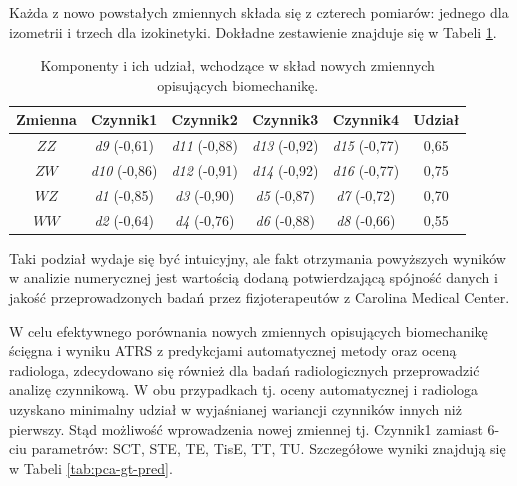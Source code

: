 Każda z nowo powstałych zmiennych składa się z czterech pomiarów: jednego dla izometrii i trzech dla izokinetyki. Dokładne zestawienie znajduje się w Tabeli \ref{tab:bio-new-factors}.
\vspace{20px}
\begin{table}[h!]
	\centering
	\setlength{\tabcolsep}{3pt}
	\setlength\extrarowheight{2pt}
	\caption{Komponenty i ich udział, wchodzące w skład nowych zmiennych opisujących biomechanikę.}
	\label{tab:bio-new-factors}
	\begin{tabular}{c|c|c|c|c||c}
		Zmienna&Czynnik1&Czynnik2&Czynnik3&Czynnik4&Udział \\
		\hline \hline
		$ZZ$&\textit{d9} (-0,61)&\textit{d11} (-0,88)&\textit{d13} (-0,92)&\textit{d15} (-0,77)&0,65\\
		\hline
		$ZW$&\textit{d10} (-0,86)&\textit{d12} (-0,91)&\textit{d14} (-0,92)&\textit{d16} (-0,77)&0,75\\
		\hline
		$WZ$&\textit{d1} (-0,85)&\textit{d3} (-0,90)&\textit{d5} (-0,87)&\textit{d7} (-0,72)&0,70\\
		\hline
		$WW$&\textit{d2} (-0,64)&\textit{d4} (-0,76)&\textit{d6} (-0,88)&\textit{d8} (-0,66)&0,55\\
		
		
	\end{tabular}
\end{table}

Taki podział wydaje się być intuicyjny, ale fakt otrzymania powyższych wyników w analizie numerycznej jest wartością dodaną potwierdzającą spójność danych \linebreak i jakość przeprowadzonych badań przez fizjoterapeutów z Carolina Medical Center. 

W celu efektywnego porównania nowych zmiennych opisujących biomechanikę ścięgna i wyniku ATRS z predykcjami automatycznej metody oraz oceną radiologa, zdecydowano się również dla badań radiologicznych przeprowadzić analizę czynnikową. W obu przypadkach tj. oceny automatycznej i radiologa uzyskano minimalny udział w wyjaśnianej wariancji czynników innych niż pierwszy. Stąd możliwość wprowadzenia nowej zmiennej tj. Czynnik1 zamiast 6-ciu parametrów: SCT, STE, TE, TisE, TT, TU. Szczegółowe wyniki znajdują się w Tabeli \ref{tab:pca-gt-pred}.


